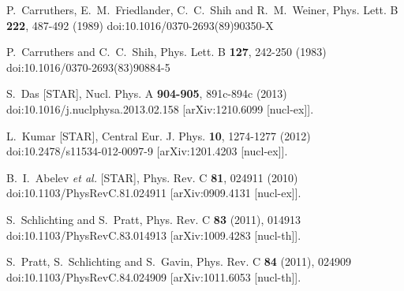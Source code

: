 \begin{thebibliography}{99}
P.~Carruthers, E.~M.~Friedlander, C.~C.~Shih and R.~M.~Weiner,
Phys. Lett. B \textbf{222}, 487-492 (1989)
doi:10.1016/0370-2693(89)90350-X

P.~Carruthers and C.~C.~Shih,
Phys. Lett. B \textbf{127}, 242-250 (1983)
doi:10.1016/0370-2693(83)90884-5

S.~Das [STAR],
Nucl. Phys. A \textbf{904-905}, 891c-894c (2013)
doi:10.1016/j.nuclphysa.2013.02.158
[arXiv:1210.6099 [nucl-ex]].

L.~Kumar [STAR],
Central Eur. J. Phys. \textbf{10}, 1274-1277 (2012)
doi:10.2478/s11534-012-0097-9
[arXiv:1201.4203 [nucl-ex]].

B.~I.~Abelev \textit{et al.} [STAR],
Phys. Rev. C \textbf{81}, 024911 (2010)
doi:10.1103/PhysRevC.81.024911
[arXiv:0909.4131 [nucl-ex]].












S.~Schlichting and S.~Pratt,
Phys. Rev. C \textbf{83} (2011), 014913
doi:10.1103/PhysRevC.83.014913
[arXiv:1009.4283 [nucl-th]].

S.~Pratt, S.~Schlichting and S.~Gavin,
Phys. Rev. C \textbf{84} (2011), 024909
doi:10.1103/PhysRevC.84.024909
[arXiv:1011.6053 [nucl-th]].


\end{thebibliography}
